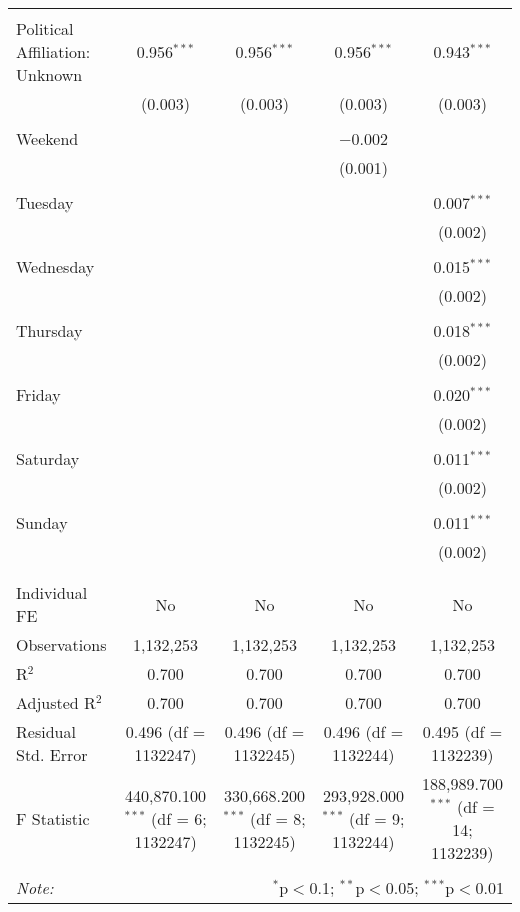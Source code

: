 \documentclass[
]{article}
\begin{document}
\begin{table}[!htbp]
{\begin{tabular}{@{\extracolsep{5pt}}lcccc}
  & & & & \\ 
 Political Affiliation: Unknown & 0.956$^{***}$ & 0.956$^{***}$ & 0.956$^{***}$ & 0.943$^{***}$ \\ 
  & (0.003) & (0.003) & (0.003) & (0.003) \\ 
  & & & & \\ 
 Weekend &  &  & $-$0.002 &  \\ 
  &  &  & (0.001) &  \\ 
  & & & & \\ 
 Tuesday &  &  &  & 0.007$^{***}$ \\ 
  &  &  &  & (0.002) \\ 
  & & & & \\ 
 Wednesday &  &  &  & 0.015$^{***}$ \\ 
  &  &  &  & (0.002) \\ 
  & & & & \\ 
 Thursday &  &  &  & 0.018$^{***}$ \\ 
  &  &  &  & (0.002) \\ 
  & & & & \\ 
 Friday &  &  &  & 0.020$^{***}$ \\ 
  &  &  &  & (0.002) \\ 
  & & & & \\ 
 Saturday &  &  &  & 0.011$^{***}$ \\ 
  &  &  &  & (0.002) \\ 
  & & & & \\ 
 Sunday &  &  &  & 0.011$^{***}$ \\ 
  &  &  &  & (0.002) \\ 
  & & & & \\ 
\hline \\[-1.8ex] 
Individual FE & No & No & No & No \\ 
Observations & 1,132,253 & 1,132,253 & 1,132,253 & 1,132,253 \\ 
R$^{2}$ & 0.700 & 0.700 & 0.700 & 0.700 \\ 
Adjusted R$^{2}$ & 0.700 & 0.700 & 0.700 & 0.700 \\ 
Residual Std. Error & 0.496 (df = 1132247) & 0.496 (df = 1132245) & 0.496 (df = 1132244) & 0.495 (df = 1132239) \\ 
F Statistic & 440,870.100$^{***}$ (df = 6; 1132247) & 330,668.200$^{***}$ (df = 8; 1132245) & 293,928.000$^{***}$ (df = 9; 1132244) & 188,989.700$^{***}$ (df = 14; 1132239) \\ 
\hline 
\hline \\[-1.8ex] 
\textit{Note:}  & \multicolumn{4}{r}{$^{*}$p$<$0.1; $^{**}$p$<$0.05; $^{***}$p$<$0.01} \\ 
\end{tabular}
} 
\end{table} 
\newpage
\end{document}
